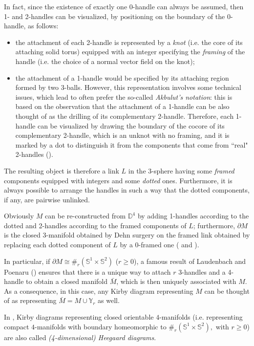\documentclass[12pt,a4paper]{article}
\begin{document}
In fact, since the existence of exactly one $0$-handle can always be assumed, then 1- and 2-handles can be visualized, by positioning on the boundary of the $0$-handle, as follows:
\begin{itemize}
    \item the attachment of each 2-handle is represented by a {\it knot} (i.e. the core of its attaching solid torus) equipped with an integer specifying the {\it framing} of the handle (i.e. the choice of a normal vector field on the knot); 
    \item the attachment of a 1-handle would be specified by its attaching region formed by two 3-balls. However, this representation involves some technical issues, which lead to often prefer the so-called {\it Akbulut's notation}: this is based on the observation that the attachment of a 1-handle can be also thought of as the drilling of its complementary 2-handle. Therefore, each 1-handle can be visualized by drawing the boundary of the cocore of its complementary 2-handle, which is an unknot with no framing, and it is marked by a dot to distinguish it from the components that come from ``real" 2-handles  (\cite{GS}).
\end{itemize}

The resulting object is therefore a link $L$ in the 3-sphere having some {\it framed} components equipped with integers and some {\it dotted} ones. Furthermore, it is always possible to arrange the handles in such a way that the dotted components, if any, are pairwise unlinked.  

Obviously $M$ can be re-constructed from $\mathbb D^4$ by adding 1-handles according to the dotted and 2-handles according to the framed components of $L$; furthermore, $\partial M$ is the closed 3-manifold obtained by Dehn surgery on the framed link obtained by replacing each dotted component of $L$ by a 0-framed one (\cite{GS}  and \cite{[M]}). 

In particular, if $\partial M\cong\#_r(\mathbb S^1\times\mathbb S^2)$ ($r\geq 0$), a famous result of Laudenbach and Poenaru (\cite{Laudenbach-Poenaru}) ensures that there is a unique way to attach $r$ 3-handles and a 4-handle to obtain a closed manifold $\bar M$, which is then uniquely associated with $M$.
As a consequence, in this case, any Kirby diagram representing $M$ can be thought of as representing $\bar M = M \cup \mathbb Y_r$ 
as well.


In \cite{Montesinos}, Kirby diagrams representing closed orientable $4$-manifolds (i.e. representing compact $4$-manifolds with boundary homeomorphic to $\#_r(\mathbb S^1\times\mathbb S^2),$ with $r\geq 0$) are also called {\it (4-dimensional) Heegaard diagrams}.  
\end{document}
